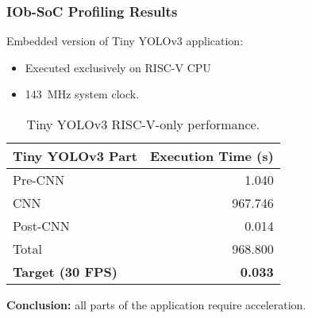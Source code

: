 


\begin{frame}
  \frametitle{IOb-SoC Profiling Results}

  Embedded version of Tiny YOLOv3 application:
  \begin{itemize}
  \item Executed exclusively on RISC-V CPU
  \item 143~MHz system clock.
  \end{itemize}
  
\begin{table}[!htb]
	\renewcommand{\arraystretch}{1.2} %
	\centering
	\begin{tabular}{|l|r|}
          \hline
		Tiny YOLOv3 Part          & Execution Time (s)\\ \hline
		Pre-CNN	                  & 1.040\\ \hline
		CNN		          & 967.746\\ \hline
		Post-CNN	          & 0.014\\ \hline
                Total                     & 968.800\\ \hline
                \textbf{Target (30 FPS)}  & \textbf{0.033} \\ \hline
	\end{tabular}
	\caption{Tiny YOLOv3 RISC-V-only performance.}
\end{table}

\textbf{Conclusion:} all parts of the application require acceleration.
\end{frame}

